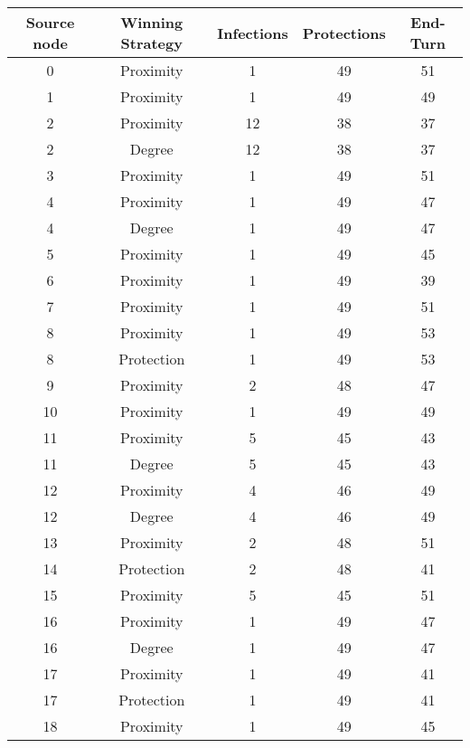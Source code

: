 \documentclass[results.tex]{subfiles}
\begin{document}
\begin{center}
  \begin{tabular}{| c || c | c | c | c |}
    \hline
    {\bfseries Source node} & {\bfseries Winning Strategy} & {\bfseries Infections} & {\bfseries Protections} & {\bfseries End-Turn} \\  %
    \hline\hline
    0 & Proximity & 1 & 49 & 51 \\ 
    \hline
    1 & Proximity & 1 & 49 & 49 \\ 
    \hline
    2 & Proximity & 12 & 38 & 37 \\ 
    \hline
    2 & Degree & 12 & 38 & 37 \\ 
    \hline
    3 & Proximity & 1 & 49 & 51 \\ 
    \hline
    4 & Proximity & 1 & 49 & 47 \\ 
    \hline
    4 & Degree & 1 & 49 & 47 \\ 
    \hline
    5 & Proximity & 1 & 49 & 45 \\ 
    \hline
    6 & Proximity & 1 & 49 & 39 \\ 
    \hline
    7 & Proximity & 1 & 49 & 51 \\ 
    \hline
    8 & Proximity & 1 & 49 & 53 \\ 
    \hline
    8 & Protection & 1 & 49 & 53 \\ 
    \hline
    9 & Proximity & 2 & 48 & 47 \\ 
    \hline
    10 & Proximity & 1 & 49 & 49 \\ 
    \hline
    11 & Proximity & 5 & 45 & 43 \\ 
    \hline
    11 & Degree & 5 & 45 & 43 \\ 
    \hline
    12 & Proximity & 4 & 46 & 49 \\ 
    \hline
    12 & Degree & 4 & 46 & 49 \\ 
    \hline
    13 & Proximity & 2 & 48 & 51 \\ 
    \hline
    14 & Protection & 2 & 48 & 41 \\ 
    \hline
    15 & Proximity & 5 & 45 & 51 \\ 
    \hline
    16 & Proximity & 1 & 49 & 47 \\ 
    \hline
    16 & Degree & 1 & 49 & 47 \\ 
    \hline
    17 & Proximity & 1 & 49 & 41 \\ 
    \hline
    17 & Protection & 1 & 49 & 41 \\ 
    \hline
    18 & Proximity & 1 & 49 & 45 \\ 

\end{tabular}
\end{center}
\end{document}
